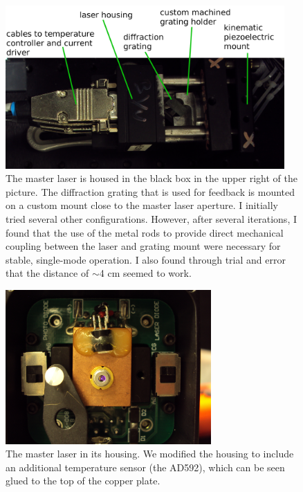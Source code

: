\begin{figure}
\centerline{
\includegraphics[width=0.95\textwidth]{master_laser.JPG}}
\caption[Photograph of Master Laser]{\label{master_laser_photo} The master laser is housed in the black box in the upper right of the picture. The diffraction grating that is used for feedback is mounted on a custom mount close to the master laser aperture. I initially tried several other configurations. However, after several iterations, I found that the use of the metal rods to provide direct  mechanical coupling between the laser and grating mount were necessary for stable, single-mode operation. I also found through trial and error that the distance of $\sim$4 cm seemed to work. }
\end{figure}

\begin{figure}
\centerline{
\includegraphics[width=0.7\textwidth]{laser_on_in_housing.JPG}}
\caption[Photograph of Master Laser Diode]{\label{master_laser_interior_photo} The master laser in its housing. We modified the housing to include an additional temperature sensor (the AD592), which can be seen glued to the top of the copper plate.}
\end{figure}

